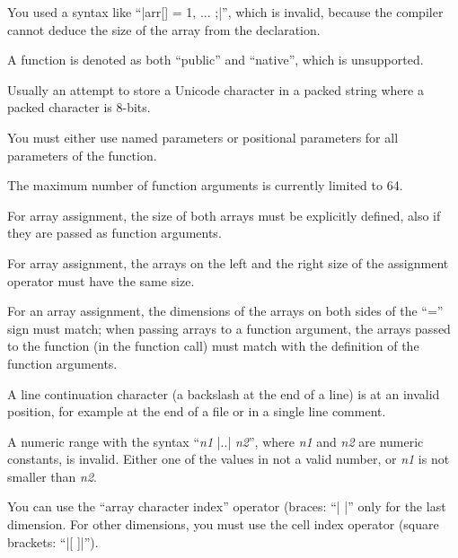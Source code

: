{ 
        You used a syntax like ``|arr[] = { 1, ... };|'', which is
        invalid, because the compiler cannot deduce the size of the array
        from the declaration.

 
        A function is denoted as both ``public'' and ``native'', which is
        unsupported.

 
        Usually an attempt to store a Unicode character in a packed string
        where a packed character is 8-bits.

 
        You must either use named parameters or positional parameters for
        all parameters of the function.

 
        The maximum number of function arguments is currently limited to 64.

 
        For array assignment, the size of both arrays must be explicitly
        defined, also if they are passed as function arguments.

 
        For array assignment, the arrays on the left and the right size of
        the assignment operator must have the same size.

 
        For an array assignment, the dimensions of the arrays on both sides of
        the ``='' sign must match; when passing arrays to a function argument,
        the arrays passed to the function (in the function call) must match
        with the definition of the function arguments.

        A line continuation character (a backslash at the end of a line)
        is at an invalid position, for example at the end of a file or in
        a single line comment.

 
        A numeric range with the syntax ``{\it n1} |..| {\it n2}'', where
        {\it n1\/} and {\it n2} are numeric constants, is invalid. Either one
        of the values in not a valid number, or {\it n1\/} is not smaller than
        {\it n2}.

 
        You can use the ``array character index'' operator (braces: ``|{ }|''
        only for the last dimension. For other dimensions, you must use the
        cell index operator (square brackets: ``|[ ]|'').

}
